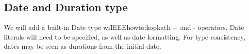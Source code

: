 \documentclass[11pt]{article}
\begin{document}
\subsection{Date and Duration type}

We will add a built-in Date type wiIEEEhowto:kopkath + and - operators. Date literals will need to be specified, as well as date formatting. For type consistency, dates may be seen as durations from the initial date.

\end{document}
